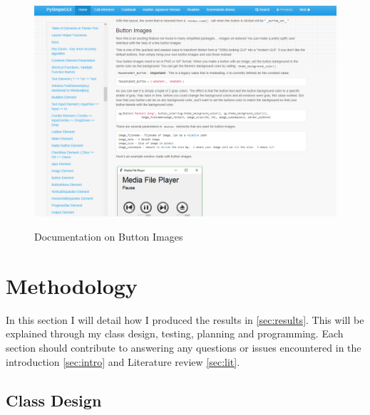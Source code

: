 \documentclass[final]{cmpreport}
\begin{document}
		\begin{figure}[H]
		\caption{Documentation on Button Images}
		\centering
		\includegraphics[scale=0.5]{buttonimg.png}
		\label{fig:button}
	\end{figure}


	\section{Methodology}\label{sec:method}
	
	In this section I will detail how I produced the results in \ref{sec:results}. This will be explained through my class design, testing, planning and programming. Each section should contribute to answering any questions or issues encountered in the introduction \ref{sec:intro} and Literature review \ref{sec:lit}.
	
	\subsection{Class Design} \label{sec:class} 
	
\end{document}
